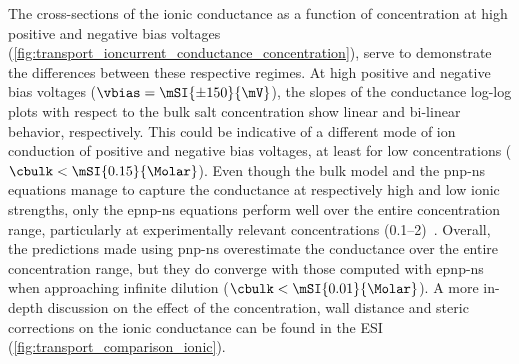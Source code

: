 The cross-sections of the ionic conductance as a function of concentration at high positive and negative bias
voltages (\cref{fig:transport_ioncurrent_conductance_concentration}), serve to demonstrate the differences
between these respective regimes. At high positive and negative bias voltages ($\vbias=\mSI{\pm150}{\mV}$),
the slopes of the conductance log-log plots with respect to the bulk salt concentration show linear and
bi-linear behavior, respectively. This could be indicative of a different mode of ion conduction of positive
and negative bias voltages, at least for low concentrations ($\cbulk<\mSI{0.15}{\Molar}$). Even though the
bulk model and the \gls{pnp-ns} equations manage to capture the conductance at respectively high and low ionic
strengths, only the \gls{epnp-ns} equations perform well over the entire concentration range, particularly at
experimentally relevant concentrations (\SIrange{0.1}{2}{\Molar})~\cite{Willems-Ruic-Biesemans-2019,
Galenkamp-2020,Franceschini-2013,Franceschini-2016}. Overall, the predictions made using \gls{pnp-ns}
overestimate the conductance over the entire concentration range, but they do converge with those computed
with \gls{epnp-ns} when approaching infinite dilution ($\cbulk<\mSI{0.01}{\Molar}$). A more in-depth
discussion on the effect of the concentration, wall distance and steric corrections on the ionic conductance
can be found in the ESI (\cref{fig:transport_comparison_ionic}).

